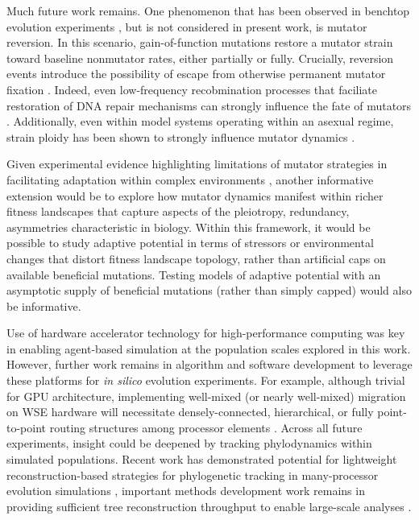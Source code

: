 Much future work remains.
One phenomenon that has been observed in benchtop evolution experiments \citep{ho2021evolutionary}, but is not considered in present work, is mutator reversion.
In this scenario, gain-of-function mutations restore a mutator strain toward baseline nonmutator rates, either partially or fully.
Crucially, reversion events introduce the possibility of escape from otherwise permanent mutator fixation \citep{taddei1997role}.
Indeed, even low-frequency recobmination processes that faciliate restoration of DNA repair mechanisms can strongly influence the fate of mutators \citep{tenaillon2000mutators}.
Additionally, even within model systems operating within an asexual regime, strain ploidy has been shown to strongly influence mutator dynamics \citep{thompson2006ploidy}.

Given experimental evidence highlighting limitations of mutator strategies in facilitating adaptation within complex environments \citep{ho2021evolutionary}, another informative extension would be to explore how mutator dynamics manifest within richer fitness landscapes that capture aspects of the pleiotropy, redundancy, asymmetries characteristic in biology.
Within this framework, it would be possible to study adaptive potential in terms of stressors or environmental changes that distort fitness landscape topology, rather than artificial caps on available beneficial mutations.
Testing models of adaptive potential with an asymptotic supply of beneficial mutations (rather than simply capped) would also be informative.

Use of hardware accelerator technology for high-performance computing was key in enabling agent-based simulation at the population scales explored in this work.
However, further work remains in algorithm and software development to leverage these platforms for \textit{in silico} evolution experiments.
For example, although trivial for GPU architecture, implementing well-mixed (or nearly well-mixed) migration on WSE hardware will necessitate densely-connected, hierarchical, or fully point-to-point routing structures among processor elements \citep{james2020physical,luczynski2024near}.
Across all future experiments, insight could be deepened by tracking phylodynamics within simulated populations.
Recent work has demonstrated potential for lightweight reconstruction-based strategies for phylogenetic tracking in many-processor evolution simulations \citep{moreno2022hereditary}, important methods development work remains in providing sufficient tree reconstruction throughput to enable large-scale analyses \citep{moreno2024trackable}.

